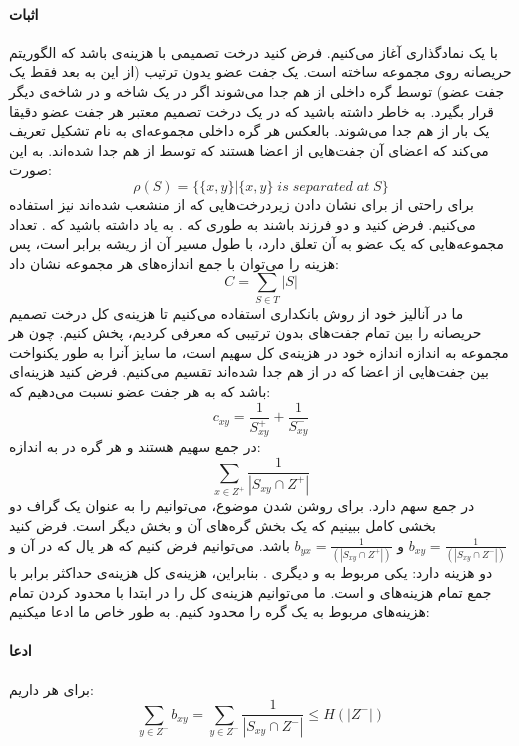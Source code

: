 \documentclass[a4paper]{article}
\begin{document}
	\paragraph{اثبات}
	با یک نمادگذاری آغاز می‌کنیم. فرض کنید 
	درخت تصمیمی با هزینه‌ی
	باشد که الگوریتم حریصانه روی مجموعه
	ساخته است. یک جفت عضو یدون ترتیب
	(از این به بعد فقط یک جفت عضو) توسط گره داخلی 
	از هم جدا می‌شوند اگر 
	در یک شاخه و
	در شاخه‌ی دیگر قرار بگیرد. به خاطر داشته باشید که در یک درخت تصمیم معتبر هر جفت عضو دقیقا یک بار از هم جدا می‌شوند. بالعکس هر گره داخلی 
	مجموعه‌ای به نام 
	تشکیل تعریف می‌کند که اعضای آن جفت‌هایی از اعضا هستند که توسط 
	از هم جدا شده‌اند. به این صورت:
	\[\rho(S) = \{\{x,y\}| \{x,y\} \; is \; separated \; at \; S\}\]
	برای راحتی از 
	برای نشان دادن زیردرخت‌هایی که از 
	منشعب شده‌اند نیز استفاده می‌کنیم.
	فرض کنید
	و
	دو فرزند
	باشند به طوری که 
	.
	به یاد داشته باشید که
	.
	تعداد مجموعه‌هایی که یک عضو به آن تعلق دارد، با طول مسیر آن از ریشه برابر است، پس هزینه
	را می‌توان با جمع اندازه‌‌های هر مجموعه
	نشان داد:
	\[C=\sum_{S\in T} |S|\]
	ما در آنالیز خود از روش بانکداری استفاده می‌کنیم تا هزینه‌ی کل درخت تصمیم حریصانه را بین تمام جفت‌های بدون ترتیبی که معرفی کردیم، پخش کنیم. چون هر مجموعه
	به اندازه اندازه خود در هزینه‌ی کل سهیم است، ما سایز آنرا به طور یکنواخت بین 
	جفت‌هایی از اعضا که در 
	از هم جدا شده‌اند تقسیم می‌کنیم. فرض کنید
	هزینه‌ای باشد که به هر جفت عضو
	نسبت می‌دهیم که:
	\[c_{xy} = \frac{1}{S^{+}_{xy}}+\frac{1}{S^{-}_{xy}}\]
	در جمع سهیم هستند و هر گره
	در 
	به اندازه:
	\[\sum_{x\in Z^+} \frac{1}{|S_{xy} \cap Z^+|}\]
	در جمع سهم دارد. برای روشن شدن موضوع، می‌توانیم 
	را به عنوان یک گراف دو بخشی کامل ببینیم که 
	یک بخش گره‌های آن و 
	بخش دیگر است.
	فرض کنید 
	$b_{xy} = \frac{1}{(|S_{xy} \cap Z^-|)}$
	و
	$b_{yx} = \frac{1}{(|S_{xy} \cap Z^+|)}$
	باشد. می‌توانیم فرض کنیم که هر یال
	\newline
	که در آن
	و 
	دو هزینه دارد: یکی مربوط به 
	و دیگری 
	.
	بنابراین، هزینه‌ی کل هزینه‌ی 
	حداکثر برابر با جمع تمام هزینه‌های
	و 
	است. ما می‌توانیم هزینه‌ی کل را در ابتدا با محدود کردن تمام هزینه‌های مربوط به یک گره را محدود کنیم.
	به طور خاص ما ادعا میکنیم:
	\paragraph{ادعا}
	برای هر 
	داریم:
	\[\sum_{y\in Z^-}b_{xy} = \sum_{y\in Z^-} \frac{1}{|S_{xy} \cap Z^-|} \le H(|Z^-|) \]
\end{document}

